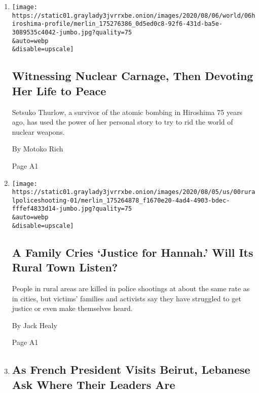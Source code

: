 \begin{enumerate}
\def\labelenumi{\arabic{enumi}.}
\item
  \href{/2020/08/06/world/asia/hiroshima-japan-setsuko-thurlow.html}{}

  \texttt{[image: https://static01.graylady3jvrrxbe.onion/images/2020/08/06/world/06hiroshima-profile/merlin\_175276386\_0d5ed0c8-92f6-431d-ba5e-3089535c4042-jumbo.jpg?quality=75\\\&auto=webp\\\&disable=upscale]}

  \hypertarget{witnessing-nuclear-carnage-then-devoting-her-life-to-peace}{%
  \subsection{Witnessing Nuclear Carnage, Then Devoting Her Life to
  Peace}\label{witnessing-nuclear-carnage-then-devoting-her-life-to-peace}}

  Setsuko Thurlow, a survivor of the atomic bombing in Hiroshima 75
  years ago, has used the power of her personal story to try to rid the
  world of nuclear weapons.

  By Motoko Rich

  Page A1
\item
  \href{/2020/08/06/us/hannah-fizer-police-shooting.html}{}

  \texttt{[image: https://static01.graylady3jvrrxbe.onion/images/2020/08/05/us/00ruralpoliceshooting-01/merlin\_175264878\_f1670e20-4ad4-4903-bdec-fffef4833d14-jumbo.jpg?quality=75\\\&auto=webp\\\&disable=upscale]}

  \hypertarget{a-family-cries-justice-for-hannah-will-its-rural-town-listen}{%
  \subsection{A Family Cries `Justice for Hannah.' Will Its Rural Town
  Listen?}\label{a-family-cries-justice-for-hannah-will-its-rural-town-listen}}

  People in rural areas are killed in police shootings at about the same
  rate as in cities, but victims' families and activists say they have
  struggled to get justice or even make themselves heard.

  By Jack Healy

  Page A1
\item
  \href{/2020/08/06/world/middleeast/beirut-explosion.html}{}

  \hypertarget{as-french-president-visits-beirut-lebanese-ask-where-their-leaders-are}{%
  \subsection{As French President Visits Beirut, Lebanese Ask Where
  Their Leaders
  Are}\label{as-french-president-visits-beirut-lebanese-ask-where-their-leaders-are}}


\end{enumerate}

